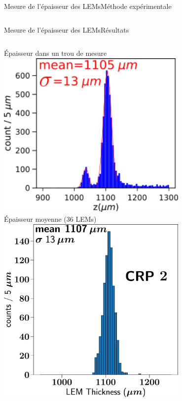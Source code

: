 \begin{frame}{Mesure de l'épaisseur des LEMs}{Méthode expérimentale}
\begin{scriptsize}
\begin{columns}
\begin{column}{0.5\textwidth}
    			\end{column}
    		\end{columns}
    	\end{scriptsize}
    \end{frame}

    \begin{frame}{Mesure de l'épaisseur des LEMs}{Résultats}
    	\begin{scriptsize}
    		\begin{columns}
    			\begin{column}{0.48\textwidth}
    				\centering
    				Épaisseur dans un trou de mesure\\
    				\centering
    				\includegraphics[width=0.7\textwidth]{./pictures/distri_1_trou_lem.png}\\
    				\vspace{0.15cm}
    				\centering
    				Épaisseur moyenne (36 LEMs)\\
    				\includegraphics[width=0.7\textwidth]{./pictures/LEM_sum_all_histo_CERN.pdf}

\end{column}
\end{columns}
\end{scriptsize}
\end{frame}
